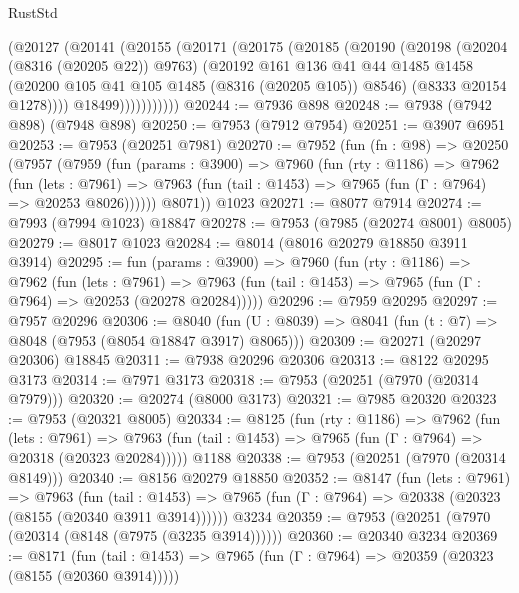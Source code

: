 \begin{lexlean}{RustStd}
\begin{coremodule}
              (@20127
                (@20141
                  (@20155
                    (@20171
                      (@20175
                        (@20185
                          (@20190
                            (@20198
                              (@20204 (@8316 (@20205 @22)) @9763)
                              (@20192
                                @161
                                @136
                                @41
                                @44
                                @1485
                                @1458
                                (@20200 @105 @41 @105 @1485 (@8316 (@20205 @105)) @8546)
                                (@8333 @20154 @1278))))
                          @18499)))))))))))
@20244 := @7936 @898
@20248 := @7938 (@7942 @898) (@7948 @898)
@20250 := @7953 (@7912 @7954)
@20251 := @3907 @6951
@20253 := @7953 (@20251 @7981)
@20270 := @7952
    (fun (fn : @98) =>
    @20250
      (@7957
        (@7959
          (fun (params : @3900) =>
          @7960
            (fun (rty : @1186) =>
            @7962
              (fun (lets : @7961) =>
              @7963 (fun (tail : @1453) => @7965 (fun (Γ : @7964) => @20253 @8026))))))
        @8071))
    @1023
@20271 := @8077 @7914
@20274 := @7993 (@7994 @1023) @18847
@20278 := @7953 (@7985 (@20274 @8001) @8005)
@20279 := @8017 @1023
@20284 := @8014 (@8016 @20279 @18850 @3911 @3914)
@20295 := fun (params : @3900) =>
  @7960
    (fun (rty : @1186) =>
    @7962
      (fun (lets : @7961) =>
      @7963 (fun (tail : @1453) => @7965 (fun (Γ : @7964) => @20253 (@20278 @20284)))))
@20296 := @7959 @20295
@20297 := @7957 @20296
@20306 := @8040
    (fun (U : @8039) => @8041 (fun (t : @7) => @8048 (@7953 (@8054 @18847 @3917) @8065)))
@20309 := @20271 (@20297 @20306) @18845
@20311 := @7938 @20296 @20306
@20313 := @8122 @20295 @3173
@20314 := @7971 @3173
@20318 := @7953 (@20251 (@7970 (@20314 @7979)))
@20320 := @20274 (@8000 @3173)
@20321 := @7985 @20320
@20323 := @7953 (@20321 @8005)
@20334 := @8125
    (fun (rty : @1186) =>
    @7962
      (fun (lets : @7961) =>
      @7963 (fun (tail : @1453) => @7965 (fun (Γ : @7964) => @20318 (@20323 @20284)))))
    @1188
@20338 := @7953 (@20251 (@7970 (@20314 @8149)))
@20340 := @8156 @20279 @18850
@20352 := @8147
    (fun (lets : @7961) =>
    @7963
      (fun (tail : @1453) =>
      @7965 (fun (Γ : @7964) => @20338 (@20323 (@8155 (@20340 @3911 @3914))))))
    @3234
@20359 := @7953 (@20251 (@7970 (@20314 (@8148 (@7975 (@3235 @3914))))))
@20360 := @20340 @3234
@20369 := @8171
    (fun (tail : @1453) => @7965 (fun (Γ : @7964) => @20359 (@20323 (@8155 (@20360 @3914)))))

\end{coremodule}
\end{lexlean}
